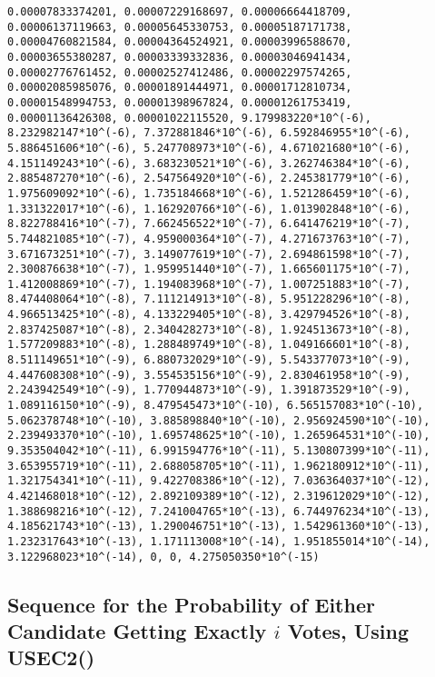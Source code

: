\documentclass[12pt]{article}
\begin{document}
\begin{verbatim}
0.00007833374201, 0.00007229168697, 0.00006664418709, 
0.00006137119663, 0.00005645330753, 0.00005187171738, 
0.00004760821584, 0.00004364524921, 0.00003996588670, 
0.00003655380287, 0.00003339332836, 0.00003046941434, 
0.00002776761452, 0.00002527412486, 0.00002297574265, 
0.00002085985076, 0.00001891444971, 0.00001712810734, 
0.00001548994753, 0.00001398967824, 0.00001261753419, 
0.00001136426308, 0.00001022115520, 9.179983220*10^(-6), 
8.232982147*10^(-6), 7.372881846*10^(-6), 6.592846955*10^(-6), 
5.886451606*10^(-6), 5.247708973*10^(-6), 4.671021680*10^(-6), 
4.151149243*10^(-6), 3.683230521*10^(-6), 3.262746384*10^(-6), 
2.885487270*10^(-6), 2.547564920*10^(-6), 2.245381779*10^(-6), 
1.975609092*10^(-6), 1.735184668*10^(-6), 1.521286459*10^(-6), 
1.331322017*10^(-6), 1.162920766*10^(-6), 1.013902848*10^(-6), 
8.822788416*10^(-7), 7.662456522*10^(-7), 6.641476219*10^(-7), 
5.744821085*10^(-7), 4.959000364*10^(-7), 4.271673763*10^(-7), 
3.671673251*10^(-7), 3.149077619*10^(-7), 2.694861598*10^(-7), 
2.300876638*10^(-7), 1.959951440*10^(-7), 1.665601175*10^(-7), 
1.412008869*10^(-7), 1.194083968*10^(-7), 1.007251883*10^(-7), 
8.474408064*10^(-8), 7.111214913*10^(-8), 5.951228296*10^(-8), 
4.966513425*10^(-8), 4.133229405*10^(-8), 3.429794526*10^(-8), 
2.837425087*10^(-8), 2.340428273*10^(-8), 1.924513673*10^(-8), 
1.577209883*10^(-8), 1.288489749*10^(-8), 1.049166601*10^(-8), 
8.511149651*10^(-9), 6.880732029*10^(-9), 5.543377073*10^(-9), 
4.447608308*10^(-9), 3.554535156*10^(-9), 2.830461958*10^(-9), 
2.243942549*10^(-9), 1.770944873*10^(-9), 1.391873529*10^(-9), 
1.089116150*10^(-9), 8.479545473*10^(-10), 6.565157083*10^(-10), 
5.062378748*10^(-10), 3.885898840*10^(-10), 2.956924590*10^(-10), 
2.239493370*10^(-10), 1.695748625*10^(-10), 1.265964531*10^(-10), 
9.353504042*10^(-11), 6.991594776*10^(-11), 5.130807399*10^(-11), 
3.653955719*10^(-11), 2.688058705*10^(-11), 1.962180912*10^(-11), 
1.321754341*10^(-11), 9.422708386*10^(-12), 7.036364037*10^(-12), 
4.421468018*10^(-12), 2.892109389*10^(-12), 2.319612029*10^(-12), 
1.388698216*10^(-12), 7.241004765*10^(-13), 6.744976234*10^(-13), 
4.185621743*10^(-13), 1.290046751*10^(-13), 1.542961360*10^(-13), 
1.232317643*10^(-13), 1.171113008*10^(-14), 1.951855014*10^(-14), 
3.122968023*10^(-14), 0, 0, 4.275050350*10^(-15)
\end{verbatim}

\subsection{Sequence for the Probability of Either Candidate Getting Exactly $i$ Votes, Using USEC2()}
\end{document}
